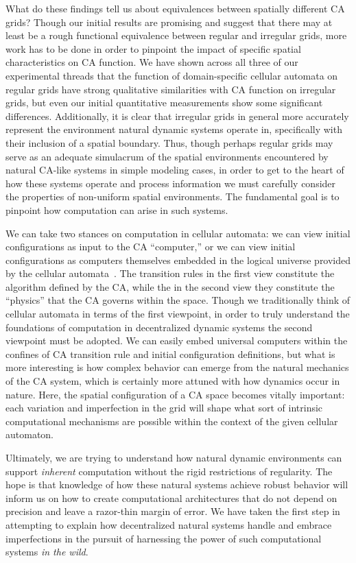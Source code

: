 \documentclass[a4paper,11pt]{article}
\begin{document}
What do these findings tell us about equivalences between spatially different CA grids? Though our initial results are promising and suggest that there may at least be a rough functional equivalence between regular and irregular grids, more work has to be done in order to pinpoint the impact of specific spatial characteristics on CA function. We have shown across all three of our experimental threads that the function of domain-specific cellular automata on regular grids have strong qualitative similarities with CA function on irregular grids, but even our initial quantitative measurements show some significant differences. Additionally, it is clear that irregular grids in general more accurately represent the environment natural dynamic systems operate in, specifically with their inclusion of a spatial boundary. Thus, though perhaps regular grids may serve as an adequate simulacrum of the spatial environments encountered by natural CA-like systems in simple modeling cases, in order to get to the heart of how these systems operate and process information we must carefully consider the properties of non-uniform spatial environments. The fundamental goal is to pinpoint how computation can arise in such systems. 

We can take two stances on computation in cellular automata: we can view initial configurations as input to the CA ``computer,'' or we can view initial configurations as computers themselves embedded in the logical universe provided by the cellular automata~\cite{la90}. The transition rules in the first view constitute the algorithm defined by the CA, while the in the second view they constitute the ``physics'' that the CA governs within the space. Though we traditionally think of cellular automata in terms of the first viewpoint, in order to truly understand the foundations of computation in decentralized dynamic systems the second viewpoint must be adopted. We can easily embed universal computers within the confines of CA transition rule and initial configuration definitions, but what is more interesting is how complex behavior can emerge from the natural mechanics of the CA system, which is certainly more attuned with how dynamics occur in nature. Here, the spatial configuration of a CA space becomes vitally important: each variation and imperfection in the grid will shape what sort of intrinsic computational mechanisms are possible within the context of the given cellular automaton.

Ultimately, we are trying to understand how natural dynamic environments can support \textit{inherent} computation without the rigid restrictions of regularity. The hope is that knowledge of how these natural systems achieve robust behavior will inform us on how to create computational architectures that do not depend on precision and leave a razor-thin margin of error. We have taken the first step in attempting to explain how  decentralized natural systems handle and embrace imperfections in the pursuit of harnessing the power of such computational systems \textit{in the wild}. 
\end{document}
